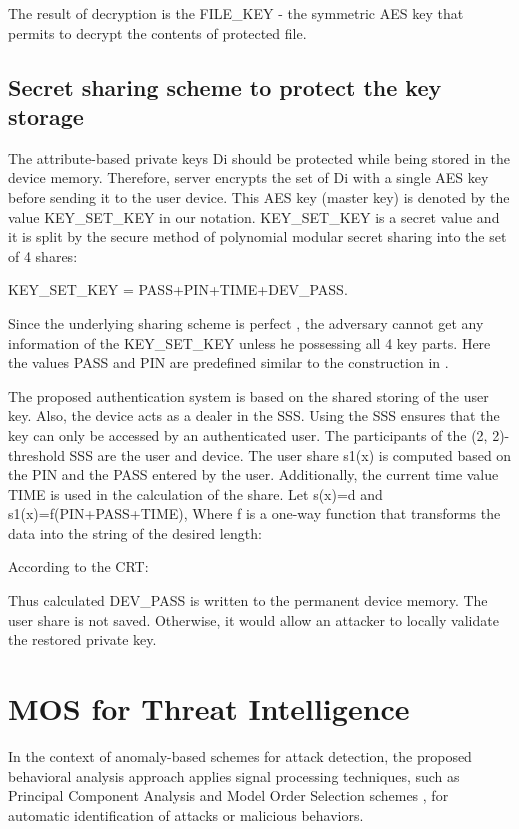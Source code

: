 \documentclass[twocolumn]{svjour3}          %
\begin{document}
The result of decryption is the FILE\_KEY - the symmetric AES key that permits to decrypt the contents of protected file. 

\subsection{Secret sharing scheme to protect the key storage }
\label{sec_secret}

The attribute-based private keys Di should be protected while being stored in the device memory. Therefore, server encrypts the set of Di with a single AES key before sending it to the user device. This AES key (master key) is denoted by the value KEY\_SET\_KEY in our notation. KEY\_SET\_KEY is a secret value and it is split by the secure method of polynomial modular secret sharing \cite{galibus2015mobile, galibus2008some} into the set of 4 shares:

KEY\_SET\_KEY = PASS+PIN+TIME+DEV\_PASS. 

Since the underlying sharing scheme is perfect \cite{galibus2008some}, the adversary cannot get any information of the KEY\_SET\_KEY unless he possessing all 4 key parts. Here the values PASS and PIN are predefined similar to the construction in \cite{galibus2015mobile}.

The proposed authentication system is based on the shared storing of the user key. Also, the device acts as a dealer in the SSS. Using the SSS ensures that the key can only be accessed by an authenticated user. The participants of the (2, 2)-threshold SSS are the user and device. The user share s1(x) is computed based on the PIN and the PASS entered by the user. Additionally, the current time value TIME is used in the calculation of the share. Let s(x)=d and s1(x)=f(PIN+PASS+TIME), 
Where f is a one-way function that transforms the data into the string of the desired length: 

According to the CRT:

Thus calculated DEV\_PASS is written to the permanent device memory. The user share is not saved. Otherwise, it would allow an attacker to locally validate the restored private key.

\section{MOS for Threat Intelligence}
\label{sec_mos}
In the context of anomaly-based schemes for attack detection, the proposed behavioral analysis approach applies signal processing techniques, such as Principal Component Analysis and Model Order Selection schemes \cite{tenorio2013greatest}, for automatic identification of attacks or malicious behaviors. 
\end{document}
